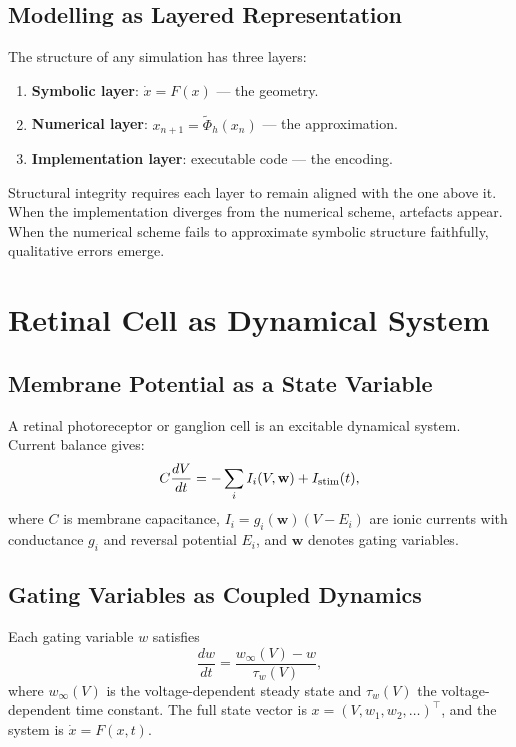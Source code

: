 \documentclass[12pt,openany]{book}
\begin{document}
\section{Modelling as Layered Representation}

The structure of any simulation has three layers:

\begin{enumerate}[leftmargin=1.5em]
  \item \textbf{Symbolic layer}: $\dot x = F(x)$ — the geometry.
  \item \textbf{Numerical layer}: $x_{n+1}=\tilde\Phi_h(x_n)$ — the
    approximation.
  \item \textbf{Implementation layer}: executable code — the encoding.
\end{enumerate}

Structural integrity requires each layer to remain aligned with the one above
it. When the implementation diverges from the numerical scheme, artefacts
appear. When the numerical scheme fails to approximate symbolic structure
faithfully, qualitative errors emerge.

\chapter{Retinal Cell as Dynamical System}
\label{ch:retina}

\section{Membrane Potential as a State Variable}

A retinal photoreceptor or ganglion cell is an excitable dynamical system.
Current balance gives:
\[
  C\frac{dV}{dt}
  = -\sum_i I_i(V,\mathbf{w}) + I_{\rm stim}(t),
\]
where $C$ is membrane capacitance, $I_i = g_i(\mathbf{w})(V-E_i)$ are ionic
currents with conductance $g_i$ and reversal potential $E_i$, and $\mathbf{w}$
denotes gating variables.

\section{Gating Variables as Coupled Dynamics}

Each gating variable $w$ satisfies
\[
  \frac{dw}{dt}
  = \frac{w_\infty(V)-w}{\tau_w(V)},
\]
where $w_\infty(V)$ is the voltage-dependent steady state and $\tau_w(V)$
the voltage-dependent time constant. The full state vector is
$x=(V,w_1,w_2,\dots)^\top$, and the system is $\dot x = F(x,t)$.
\end{document}
